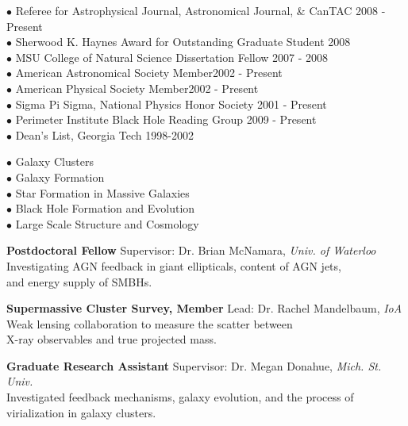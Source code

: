 \documentclass[12pt]{cv}
\begin{document}
\begin{llist}
$\bullet$ Referee for Astrophysical Journal, Astronomical Journal, \& CanTAC \hfill 2008 - Present\\
$\bullet$ Sherwood K. Haynes Award for Outstanding Graduate Student \hfill 2008\\
$\bullet$ MSU College of Natural Science Dissertation Fellow \hfill 2007 - 2008\\
$\bullet$ American Astronomical Society Member\hfill 2002 - Present\\
$\bullet$ American Physical Society Member\hfill 2002 - Present\\
$\bullet$ Sigma Pi Sigma, National Physics Honor Society \hfill 2001 - Present\\
$\bullet$ Perimeter Institute Black Hole Reading Group \hfill 2009 - Present\\
$\bullet$ Dean's List, Georgia Tech \hfill 1998-2002


$\bullet$ Galaxy Clusters\\
$\bullet$ Galaxy Formation\\
$\bullet$ Star Formation in Massive Galaxies\\
$\bullet$ Black Hole Formation and Evolution\\
$\bullet$ Large Scale Structure and Cosmology


{\sc \bf{Postdoctoral Fellow}}
Supervisor: Dr. Brian McNamara, {\textit{Univ. of Waterloo}}\\
Investigating AGN feedback in giant ellipticals, content of AGN jets,\\
and energy supply of SMBHs.

{\sc \bf{Supermassive Cluster Survey, Member}}
Lead: Dr. Rachel Mandelbaum, {\textit{IoA}}\\
Weak lensing collaboration to measure the scatter between\\
X-ray observables and true projected mass.

{\sc \bf{Graduate Research Assistant}}
Supervisor: Dr. Megan Donahue, {\textit{Mich. St. Univ.}}\\
Investigated feedback mechanisms, galaxy evolution, and the process of\\
virialization in galaxy clusters.


\end{llist}
\end{document}
